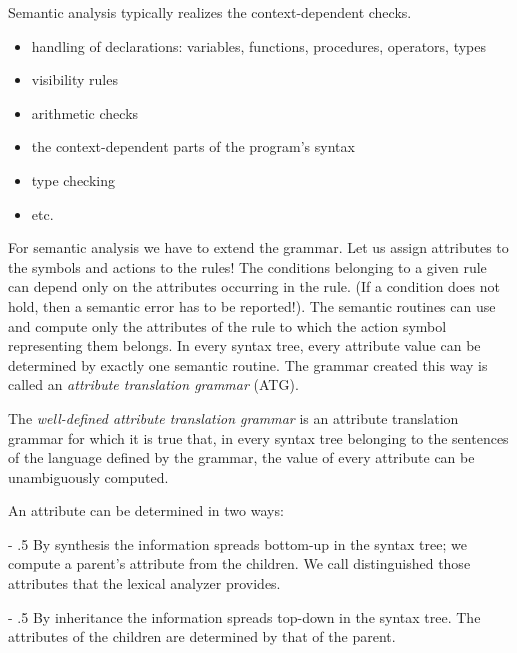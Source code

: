\documentclass[margin=0px]{article}
\makeatletter
\renewcommand\paragraph{%
    \@startsection{paragraph}{4}{0mm}%
    {-\baselineskip}%
    {.5\baselineskip}%
    {\normalfont\normalsize\bfseries}}
\makeatother
\begin{document}
Semantic analysis typically realizes the context-dependent checks.

\begin{itemize}
    \item
          handling of declarations: variables, functions, procedures, operators, 	types
    \item
          visibility rules
    \item
          arithmetic checks
    \item
          the context-dependent parts of the program's syntax
    \item
          type checking
    \item
          etc.
\end{itemize}


For semantic analysis we have to extend the grammar. Let us assign attributes to the symbols and actions to the rules! The conditions belonging to a given rule can depend only on the attributes	occurring in the rule.	(If a condition does not hold, then a semantic error has to be	reported!). The semantic routines can use and compute only the	attributes of the rule to which the action symbol representing them belongs. In every syntax tree, every attribute value can be determined by exactly one
semantic routine. The grammar created this way is called an \textit{attribute translation grammar} (ATG).

The \textit{well-defined attribute translation grammar} is an attribute translation grammar for which it is true that, in every syntax tree belonging to the sentences of the language defined by the	grammar, the value of every attribute can be unambiguously computed.

An attribute can be determined in two ways:

\paragraph{By synthesis} the information spreads bottom-up in the syntax tree; we compute a parent's attribute from the children. We call distinguished those attributes that the lexical analyzer provides.

\paragraph{By inheritance} the information spreads top-down in the syntax tree. The attributes of the children are determined by that of the parent.
\end{document}
